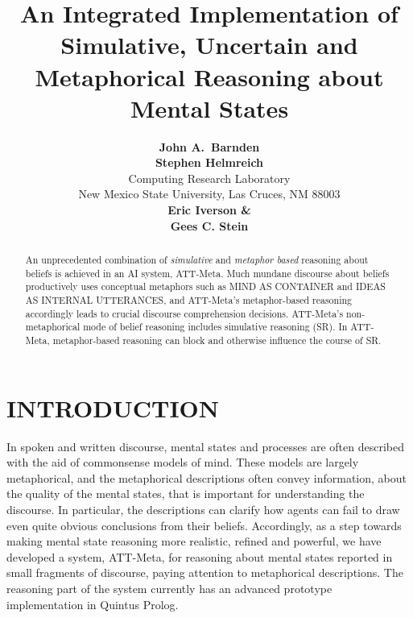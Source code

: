 % 
%
 
\title{An Integrated Implementation of
Simulative, Uncertain and Metaphorical Reasoning
about Mental States}
 
\author{ {\bf John A.~Barnden} \\  
\And 
{\bf Stephen Helmreich}  \\ 
Computing Research Laboratory  \\  
New Mexico State University, Las Cruces, NM 88003 \\ 
\And 
{\bf Eric Iverson \&}   \\ 
{\bf Gees C. Stein}   \\ 
} 
 
 
 
\maketitle 
 
 

\begin{abstract} 
An unprecedented combination of {\it simulative} and {\it metaphor based}
reasoning about beliefs is achieved in an AI system, ATT-Meta.  Much mundane
discourse about beliefs productively uses conceptual metaphors such as MIND AS
CONTAINER and IDEAS AS INTERNAL UTTERANCES, and ATT-Meta's metaphor-based
reasoning accordingly leads to crucial discourse comprehension decisions.
ATT-Meta's non-metaphorical mode of belief reasoning includes simulative
reasoning (SR). In ATT-Meta, metaphor-based reasoning can block and otherwise
influence the course of SR.
\end{abstract} 
 
\section{INTRODUCTION} %
 
In spoken and written discourse, mental states and processes are often
described with the aid of commonsense models of mind. These models are largely
metaphorical, and the metaphorical descriptions often convey information, about
the quality of the mental states, that is important for understanding the
discourse.  In particular, the descriptions can clarify how agents can fail to
draw even quite obvious conclusions from their beliefs.  Accordingly, as a step
towards making mental state reasoning more realistic, refined and powerful, we
have developed a system, ATT-Meta, for reasoning about mental states reported
in small fragments of discourse, paying attention to metaphorical descriptions.
The reasoning part of the system currently has an advanced prototype
implementation in Quintus Prolog.

